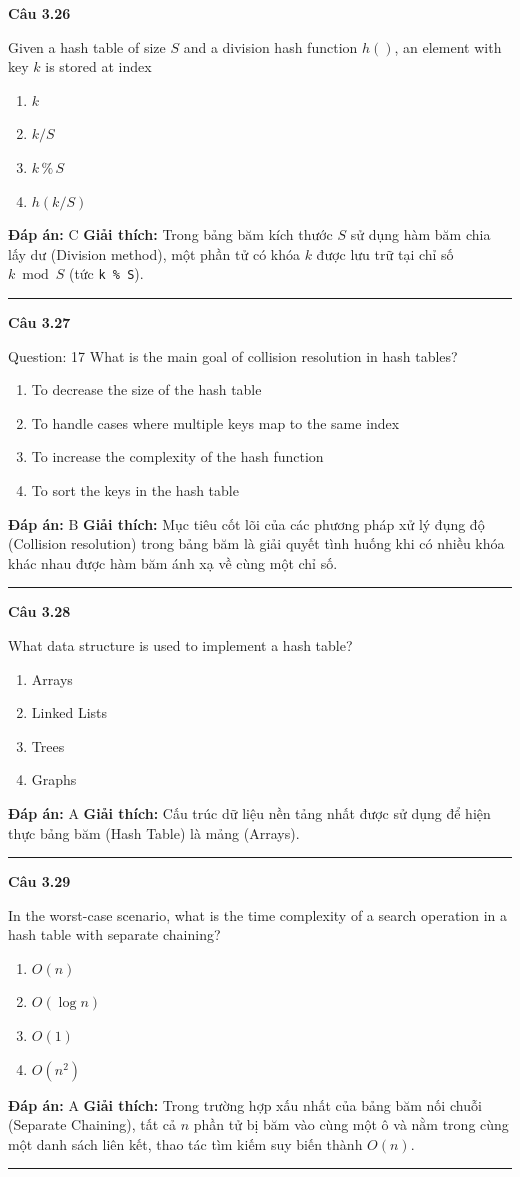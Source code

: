 \documentclass[11pt,a4paper]{article}
\newenvironment{question}[1]{%
  \par\vspace{1em}\noindent\textbf{\large Câu #1}\par\vspace{0.4em}
}{%
  \par\vspace{1em}\hrule\vspace{0.6em}
}
\newenvironment{choices}{%
  \begin{enumerate}[label=\textbf{\Alph*.},leftmargin=2.2em,itemsep=2pt,topsep=3pt]
}{%
  \end{enumerate}
}
\newcommand{\choice}{\item}
\begin{document}
\begin{question}{3.26}
Given a hash table of size $S$ and a division hash function $h()$, an element with key $k$ is stored at index
\begin{choices}
\choice $k$
\choice $k/S$
\choice $k\,\%\,S$
\choice $h(k/S)$
\end{choices}
\textbf{Đáp án:} C
\textbf{Giải thích:} Trong bảng băm kích thước $S$ sử dụng hàm băm chia lấy dư (Division method), một phần tử có khóa $k$ được lưu trữ tại chỉ số $k \bmod S$ (tức \texttt{k \% S}).
\end{question}

\begin{question}{3.27}
Question: 17 What is the main goal of collision resolution in hash tables?
\begin{choices}
\choice To decrease the size of the hash table
\choice To handle cases where multiple keys map to the same index
\choice To increase the complexity of the hash function
\choice To sort the keys in the hash table
\end{choices}
\textbf{Đáp án:} B
\textbf{Giải thích:} Mục tiêu cốt lõi của các phương pháp xử lý đụng độ (Collision resolution) trong bảng băm là giải quyết tình huống khi có nhiều khóa khác nhau được hàm băm ánh xạ về cùng một chỉ số.
\end{question}

\begin{question}{3.28}
What data structure is used to implement a hash table?
\begin{choices}
\choice Arrays
\choice Linked Lists
\choice Trees
\choice Graphs
\end{choices}
\textbf{Đáp án:} A
\textbf{Giải thích:} Cấu trúc dữ liệu nền tảng nhất được sử dụng để hiện thực bảng băm (Hash Table) là mảng (Arrays).
\end{question}

\begin{question}{3.29}
In the worst-case scenario, what is the time complexity of a search operation in a hash table with separate chaining?
\begin{choices}
\choice $O(n)$
\choice $O(\log n)$
\choice $O(1)$
\choice $O(n^2)$
\end{choices}
\textbf{Đáp án:} A
\textbf{Giải thích:} Trong trường hợp xấu nhất của bảng băm nối chuỗi (Separate Chaining), tất cả $n$ phần tử bị băm vào cùng một ô và nằm trong cùng một danh sách liên kết, thao tác tìm kiếm suy biến thành $O(n)$.
\end{question}
\end{document}
